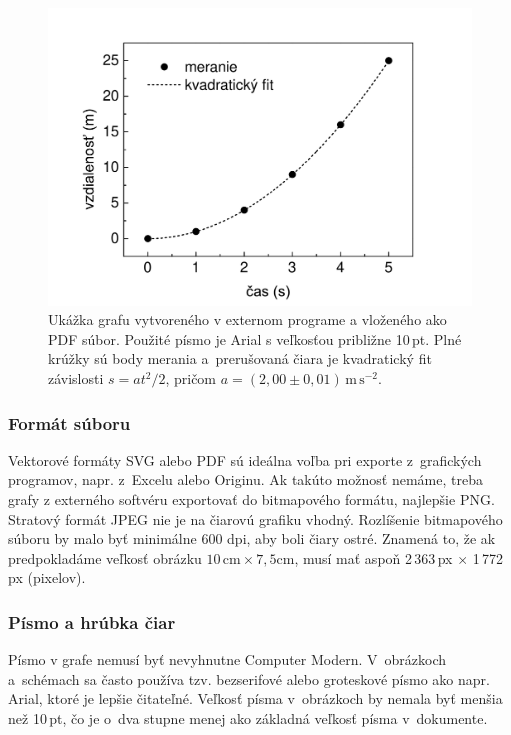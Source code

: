 \begin{figure}[h!]
  \centering
  \includegraphics[scale=0.358]{img/Graph1}
  \caption{Ukážka grafu vytvoreného v externom programe a vloženého ako PDF súbor.
  Použité písmo je Arial s veľkosťou približne 10\,pt. Plné krúžky sú body merania a~prerušovaná čiara je kvadratický fit závislosti $s = at^2/2$, pričom $a = (2{,}00 \pm0{,}01)\,\mathrm{m\,s^{-2}}$.}
  \label{fig:Graph1}
\end{figure}

\subsubsection{Formát súboru}
Vektorové formáty SVG alebo PDF sú ideálna voľba pri exporte
z~grafických programov, napr. z~Excelu alebo Originu.
Ak takúto možnosť nemáme, treba grafy z externého softvéru 
exportovať do bitmapového formátu, najlepšie PNG.
Stratový formát JPEG nie je na čiarovú grafiku vhodný. 
Rozlíšenie bitmapového súboru by malo byť minimálne 600 dpi,
aby boli čiary ostré.
Znamená to, že ak predpokladáme veľkosť obrázku
$10\,\mathrm{cm} \times 7{,}5\mathrm{cm}$,
musí mať aspoň 2\,363\,px $\times$ 1\,772\,px (pixelov).

\subsubsection{Písmo a hrúbka čiar}
Písmo v grafe nemusí byť nevyhnutne Computer Modern.
V~obrázkoch a~schémach sa často používa
tzv. bezserifové alebo groteskové písmo ako napr. Arial,
ktoré je lepšie čitateľné.
Veľkosť písma v~obrázkoch by nemala byť menšia než
10\,pt,
čo je o~dva stupne menej ako základná veľkosť písma
v~dokumente.

